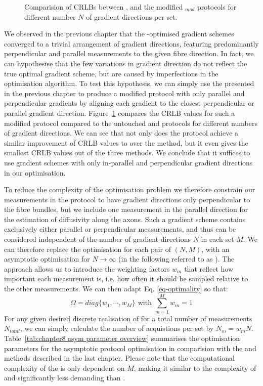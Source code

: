 \begin{figure}
\centering
	
\caption{Comparision of CRLBs between \OI{}, \SF{} and the modified \SF$_{mod}$ protocols for different number $N$ of gradient directions per set.}
\label{fig:chapter8 DIRSvsCRLB60mT mod}
\end{figure}


We observed in the previous chapter that the \SF-optimised gradient schemes converged to a trivial arrangement of gradient directions, featuring predominantly perpendicular and parallel measurements to the given fibre direction. In fact, we can hypothesise that the few variations in gradient direction do not reflect the true optimal gradient scheme, but are caused by imperfections in the optimisation algorithm. To test this hypothesis, we can simply use the \FD{} presented in the previous chapter to produce a modified \FDmod{} protocol with only parallel and perpendicular gradients by aligning each gradient  to the closest perpendicular or parallel gradient direction. Figure~\ref{fig:chapter8 DIRSvsCRLB60mT mod} compares the CRLB values for such a modified \FDmod{} protocol compared to the untouched \FD{} and \OI{} protocols for different numbers of gradient directions. We can see that not only does the \FDmod{} protocol achieve a similar improvement of CRLB values to \FD over the \OI method, but it even gives the smallest CRLB values out of the three methods. We conclude that it suffices to use gradient schemes with only  in-parallel and perpendicular gradient directions in our optimisation.
 

To reduce the complexity of the optimisation problem we therefore constrain our measurements in the protocol to have gradient directions only perpendicular to the fibre bundles, but we include one measurement in the parallel direction for the estimation of diffusivity along the axons. Such a gradient scheme contains exclusively either parallel or perpendicular measurements, and thus can be considered independent of the number of gradient directions $N$ in each set $M$. We can therefore replace the optimisation for each pair of $(N,M)$, with an asymptotic optimisation for $N\rightarrow\infty$ (in the following referred to as \SFasym{}). The \SFasym{} approach allows us to introduce the weighting factors $w_m$ that reflect how important each measurement is, i.e. how often it should be sampled relative to the other measurements. We can then adapt Eq. \ref{eq-optimality} so that:
\begin{equation}
	\Omega=diag\{w_1,\cdots,w_M\} \mbox{ with } \sum_{m=1}^{M}w_m=1
\end{equation}
For any given desired discrete realisation of \SFasym{} for a total number of measurements $N_{total}$, we can simply calculate the number of acquistions per set by $N_{m}=w_mN$. Table~\ref{tab:chapter8 asym parameter overview} summarises the optimisation parameters for the asymptotic protocol optimisation in comparision with the \OI{} and \FD{} methods described in the last chapter. Please note that the computational complexity of the \SFasym{} is only dependent on $M$, making it similar to the complexity of \OI{} and significantly less demanding than \FD{}.   

